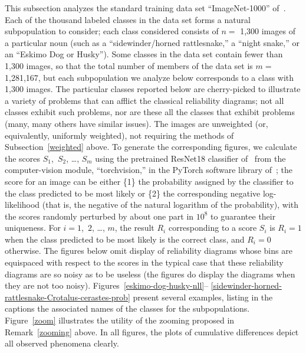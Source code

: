 \documentclass{article}
\begin{document}
This subsection analyzes the standard training data set ``ImageNet-1000''
of~\cite{imagenet}. Each of the thousand labeled classes in the data set
forms a natural subpopulation to consider; each class considered consists
of $n =$ 1,300 images of a particular noun (such as a
``sidewinder/horned rattlesnake,'' a ``night snake,''
or an ``Eskimo Dog or Husky'').
Some classes in the data set contain fewer than 1,300 images,
so that the total number of members of the data set is $m =$ 1,281,167, but
each subpopulation we analyze below corresponds to a class with 1,300 images.
The particular classes reported below are cherry-picked to illustrate
a variety of problems that can afflict the classical reliability diagrams;
not all classes exhibit such problems, nor are these all the classes
that exhibit problems (many, many others have similar issues).
The images are unweighted (or, equivalently, uniformly weighted),
not requiring the methods of Subsection~\ref{weighted} above.
To generate the corresponding figures,
we calculate the scores $S_1$,~$S_2$, \dots, $S_m$
using the pretrained ResNet18 classifier of~\cite{he-zhang-ren-sun}
from the computer-vision module, ``torchvision,''
in the PyTorch software library of~\cite{pytorch};
the score for an image can be either \{1\} the probability
assigned by the classifier to the class predicted to be most likely
or \{2\} the corresponding negative log-likelihood
(that is, the negative of the natural logarithm of the probability),
with the scores randomly perturbed by about one part in $10^8$ to guarantee
their uniqueness.
For $i = 1$,~$2$, \dots, $m$, the result $R_i$ corresponding to a score $S_i$
is $R_i = 1$ when the class predicted to be most likely is the correct class,
and $R_i = 0$ otherwise.
The figures below omit display of reliability diagrams whose bins are
equispaced with respect to the scores in the typical case
that these reliability diagrams are so noisy as to be useless
(the figures do display the diagrams when they are not too noisy).
Figures~\ref{eskimo-dog-husky-nll}--%
\ref{sidewinder-horned-rattlesnake-Crotalus-cerastes-prob}
present several examples, listing in the captions the associated names
of the classes for the subpopulations.
Figure~\ref{zoom} illustrates the utility of the zooming proposed
in Remark~\ref{zooming} above.
In all figures, the plots of cumulative differences
depict all observed phenomena clearly.
\end{document}
